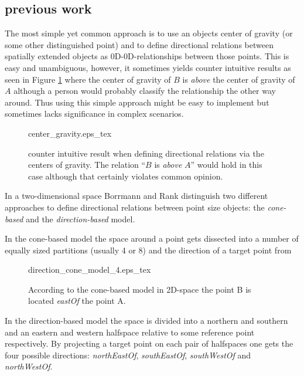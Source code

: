 \documentclass[paper=a4, fontsize=11pt]{scrartcl} %
\numberwithin{equation}{section} %
\numberwithin{figure}{section} %
\numberwithin{table}{section} %
\begin{document}
\subsection{previous work}
The most simple yet common approach is to use an objects center of gravity (or some other distinguished point) and to define directional relations between spatially extended objects as 0D-0D-relationships between those points. This is easy and unambiguous, however, it sometimes yields counter intuitive results as seen in Figure \ref{fig:center_gravity} where the center of gravity of $B$ is \emph{above} the center of gravity of $A$ although a person would probably classify the relationship the other way around. Thus using this simple approach might be easy to implement but sometimes lacks significance in complex scenarios.

\begin{figure}
  \centering
  \def\svgwidth{10em}
  {center_gravity.eps_tex}
  \caption{counter intuitive result when defining directional relations via the centers of gravity. The relation ``$B$ is \emph{above} $A$'' would hold in this case although that certainly violates common opinion.  }
\label{fig:center_gravity}
\end{figure}

In a two-dimensional space Borrmann and Rank \cite{Borrmann:2009:AEI} distinguish two different approaches to define directional relations between point size objects: the \textit{cone-based} and the \textit{direction-based} model. 

In the cone-based model the space around a point gets dissected into a number of equally sized partitions (usually 4 or 8) and the direction of a target point from 

\begin{figure}
  \centering
  \def\svgwidth{15em}
  {direction_cone_model_4.eps_tex}
  \caption{According to the cone-based model in 2D-space the point B is located \emph{eastOf} the point A.}
\label{fig:direction_cone_model_4}
\end{figure}

In the direction-based model the space is divided into a northern and southern and an eastern and western halfspace relative to some reference point respectively. By projecting a target point on each pair of halfspaces one gets the four possible directions: \emph{northEastOf}, \emph{southEastOf}, \emph{southWestOf} and \emph{northWestOf}. 
\end{document}
